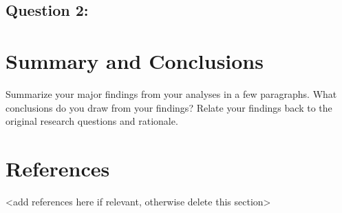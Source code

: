 \documentclass[12pt,]{article}
\begin{document}
\hypertarget{question-2}{%
\subsection{Question 2:}\label{question-2}}

\newpage

\hypertarget{summary-and-conclusions}{%
\section{Summary and Conclusions}\label{summary-and-conclusions}}

Summarize your major findings from your analyses in a few paragraphs.
What conclusions do you draw from your findings? Relate your findings
back to the original research questions and rationale.

\newpage

\hypertarget{references}{%
\section{References}\label{references}}

\textless{}add references here if relevant, otherwise delete this
section\textgreater{}
\end{document}
